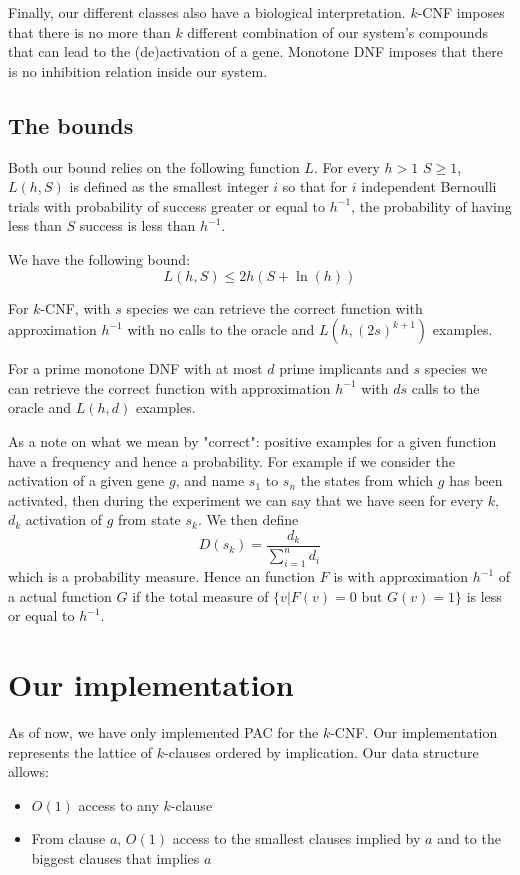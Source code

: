 \documentclass[fontsize=9pt,enabledeprecatedfontcommands]{scrartcl}
\begin{document}
Finally, our different classes also have a biological interpretation. $k$-CNF imposes that there is no more than $k$ different combination of our system's compounds that can lead to the (de)activation of a gene. Monotone DNF imposes that there is no inhibition relation inside our system.

\subsection{The bounds}

Both our bound relies on the following function $L$. For every $h > 1$ $S \geq 1$, $L(h,S)$ is defined as the smallest integer $i$ so that for $i$ independent Bernoulli trials with probability of success greater or equal to $h^{-1}$, the probability of having less than $S$ success is less than $h^{-1}$.

We have the following bound:
\[
L(h,S) \leq 2h\left(S+\ln(h)\right)
\]

For $k$-CNF, with $s$ species we can retrieve the correct function with approximation $h^{-1}$ with no calls to the oracle and $L(h,(2s)^{k+1})$ examples.

For a prime monotone DNF with at most $d$ prime implicants and $s$ species we can retrieve the correct function with approximation $h^{-1}$ with $ds$ calls to the oracle and $L(h,d)$ examples.

As a note on what we mean by "correct": positive examples for a given function have a frequency and hence a probability. For example if we consider the activation of a given gene $g$, and name $s_1$ to $s_n$ the states from which $g$ has been activated, then during the experiment we can say that we have seen for every $k$, $d_k$ activation of $g$ from state $s_k$. We then define $$D(s_k) = \frac{d_k}{\sum_{i=1}^{n}d_i}$$ which is a probability measure. Hence an function $F$ is with approximation $h^{-1}$ of a actual function $G$ if the total measure of $\{v | F(v) = 0 \text{ but } G(v)=1\}$ is less or equal to $ h^{-1}$.

\section{Our implementation}
As of now, we have only implemented PAC for the $k$-CNF. Our implementation represents the lattice of $k$-clauses ordered by implication. Our data structure allows:
\begin{itemize}
	\item $O(1)$ access to any $k$-clause
	\item From clause $a$, $O(1)$ access to the smallest clauses implied by $a$ and to the biggest clauses that implies $a$
\end{itemize}
\end{document}
